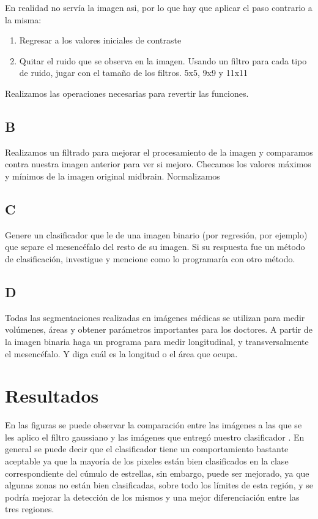 \documentclass[10pt,journal,compsoc]{IEEEtran}\usepackage[T1]{fontenc}                              %
\begin{document}
En realidad no servía la imagen asi, por lo que hay que aplicar el paso contrario a la misma:

\begin{enumerate}
  \item Regresar a los valores iniciales de contraste
  \item Quitar el ruido que se observa en la imagen. Usando un filtro para cada tipo de ruido, jugar con el tamaño de los filtros. 5x5, 9x9 y 11x11
\end{enumerate}

Realizamos las operaciones necesarias para revertir las funciones.

\subsection{B}

Realizamos un filtrado para mejorar el procesamiento de la imagen y comparamos  contra nuestra imagen anterior para ver si mejoro.
Checamos los valores máximos y mínimos de la imagen original midbrain. Normalizamos

\subsection{C}

Genere un clasificador que le de una imagen binario (por regresión, por ejemplo) que separe el mesencéfalo del resto de su imagen. Si su respuesta fue un método de clasificación, investigue y mencione como lo programaría con otro método.

\subsection{D}

Todas las segmentaciones realizadas en imágenes médicas se utilizan para medir volúmenes, áreas y obtener parámetros importantes para los doctores. A partir de la imagen binaria haga un programa para medir longitudinal, y transversalmente el mesencéfalo. Y diga cuál es la longitud o el área que ocupa.

\section{Resultados}


En las figuras se puede observar la comparación entre las imágenes a las que se les aplico el filtro gaussiano y las imágenes que entregó nuestro clasificador .
En general se puede decir que el clasificador tiene un comportamiento bastante aceptable ya que la mayoría de los pixeles están bien clasificados en la clase correspondiente del cúmulo de estrellas, sin embargo, puede ser mejorado, ya que algunas zonas no están bien clasificadas, sobre todo los límites de esta región, y se podría mejorar la detección de los mismos y una mejor diferenciación entre las tres regiones.
\end{document}
